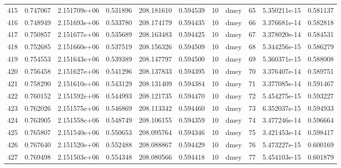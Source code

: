 \begin{tabular}{lrrrrrrlrrr}
415  &    0.747067 &        2.151709e+06 &  0.531896 &              208.181610 &    0.594539 &      10 &         dmey &     65 &   5.350211e-15 &      0.581137 \\
416  &    0.748949 &        2.151693e+06 &  0.533780 &              208.174179 &    0.594435 &      10 &         dmey &     66 &   3.376681e-14 &      0.582818 \\
417  &    0.750857 &        2.151677e+06 &  0.535689 &              208.163483 &    0.594425 &      10 &         dmey &     67 &   3.378020e-14 &      0.584531 \\
418  &    0.752685 &        2.151660e+06 &  0.537519 &              208.156326 &    0.594509 &      10 &         dmey &     68 &   5.344256e-15 &      0.586279 \\
419  &    0.754553 &        2.151643e+06 &  0.539389 &              208.147797 &    0.594500 &      10 &         dmey &     69 &   5.360371e-15 &      0.588008 \\
420  &    0.756458 &        2.151627e+06 &  0.541296 &              208.137833 &    0.594395 &      10 &         dmey &     70 &   3.376407e-14 &      0.589751 \\
421  &    0.758290 &        2.151610e+06 &  0.543129 &              208.131409 &    0.594384 &      10 &         dmey &     71 &   3.377085e-14 &      0.591467 \\
422  &    0.760152 &        2.151592e+06 &  0.544993 &              208.121735 &    0.594470 &      10 &         dmey &     72 &   5.454275e-15 &      0.593227 \\
423  &    0.762026 &        2.151575e+06 &  0.546869 &              208.113342 &    0.594460 &      10 &         dmey &     73 &   6.352037e-15 &      0.594933 \\
424  &    0.763905 &        2.151558e+06 &  0.548749 &              208.106155 &    0.594359 &      10 &         dmey &     74 &   3.477246e-14 &      0.596664 \\
425  &    0.765807 &        2.151540e+06 &  0.550653 &              208.095764 &    0.594346 &      10 &         dmey &     75 &   3.421453e-14 &      0.598417 \\
426  &    0.767640 &        2.151520e+06 &  0.552488 &              208.088867 &    0.594429 &      10 &         dmey &     76 &   5.473227e-15 &      0.600169 \\
427  &    0.769498 &        2.151503e+06 &  0.554348 &              208.080566 &    0.594418 &      10 &         dmey &     77 &   5.454103e-15 &      0.601879 \\

\end{tabular}
